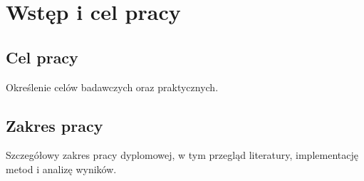 \chapter{Wstęp i cel pracy}

\section{Cel pracy}
Określenie celów badawczych oraz praktycznych.

\section{Zakres pracy}
Szczegółowy zakres pracy dyplomowej, w tym przegląd literatury, implementację metod i analizę wyników.
